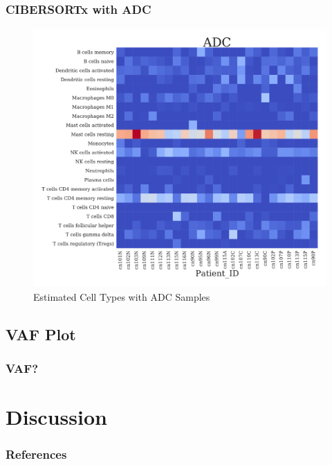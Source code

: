 \documentclass{beamer}
\begin{document}
    \begin{frame}
        \frametitle{CIBERSORTx with ADC}

        \begin{figure}
            \includegraphics[width=0.6 \linewidth]{figures/CIBERSORTx/ADC.Bowtie2.CibersortX.pdf}
            \caption{Estimated Cell Types with ADC Samples}
        \end{figure}
    \end{frame}

    \subsection{VAF Plot}
    \begin{frame}
        \frametitle{VAF?}
    \end{frame}

    \section{Discussion}

    \begin{frame}[allowframebreaks]
        \frametitle{References}
        
        
    \end{frame}
\end{document}
